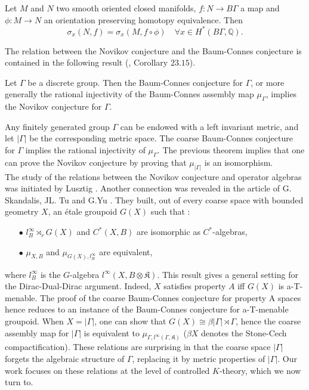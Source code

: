\begin{conj}[Novikov]\label{Novikov}
Let $M$ and $N$ two smooth oriented closed manifolds, $f: N\rightarrow B\Gamma$ a map and $\phi : M\rightarrow N$ an orientation preserving homotopy equivalence. Then 
\[\sigma_x(N,f)= \sigma_x(M,f\circ\phi )\quad \forall x\in H^*(B\Gamma,\mathbb Q).\]
\end{conj}

The relation between the Novikov conjecture and the Baum-Connes conjecture is contained in the following result (\cite{kreckluck}, Corollary $23.15$).
\begin{thm}
Let $\Gamma$ be a discrete group. Then the Baum-Connes conjecture for $\Gamma$, or more generally the rational injectivity of the Baum-Connes assembly map $\mu_\Gamma$, implies the Novikov conjecture for $\Gamma$.
\end{thm}

Any finitely generated group $\Gamma$ can be endowed with a left invariant metric, and let $|\Gamma|$ be the corresponding metric space. The coarse Baum-Connes conjecture for $\Gamma$ implies the rational injectivity of $\mu_\Gamma$. The previous theorem implies that one can prove the Novikov conjecture by proving that $\mu_{|\Gamma|}$ is an isomorphism. \\

The study of the relations between the Novikov conjecture and operator algebras was initiated by Lusztig \cite{lusztig}. Another connection was revealed in the article of G. Skandalis, JL. Tu and G.Yu \cite{SkTuYu}. They built, out of every coarse space with bounded geometry $X$, an étale groupoid $G(X)$ such that :\\
\begin{itemize}
\item[$\bullet$] $l^\infty_B \rtimes_r G(X)$ and $C^*(X,B)$ are isomorphic as $C^*$-algebras,
\item[$\bullet$] $\mu_{X,B}$ and $\mu_{G(X),l^\infty_B}$ are equivalent,\\
\end{itemize}
where $l^\infty_B$ is the $G$-algebra $l^\infty(X,B\otimes\mathfrak K)$. This result gives a general setting for the Dirac-Dual-Dirac argument. Indeed, $X$ satisfies property $A$ iff $G(X)$ is a-T-menable. The proof of the coarse Baum-Connes conjecture for property A spaces hence reduces to an instance of the Baum-Connes conjecture for a-T-menable groupoid. When $X=|\Gamma|$, one can show that $G(X) \cong \beta |\Gamma| \rtimes \Gamma$, hence the coarse assembly map for $|\Gamma|$ is equivalent to $\mu_{\Gamma,l^\infty(\Gamma, \mathfrak K)}$ \cite{SkTuYu} ($\beta X$ denotes the Stone-Cech compactification). These relations are surprising in that the coarse space $|\Gamma|$ forgets the algebraic structure of $\Gamma$, replacing it by metric properties of $|\Gamma|$. Our work focuses on these relations at the level of controlled $K$-theory, which we now turn to.  \\

